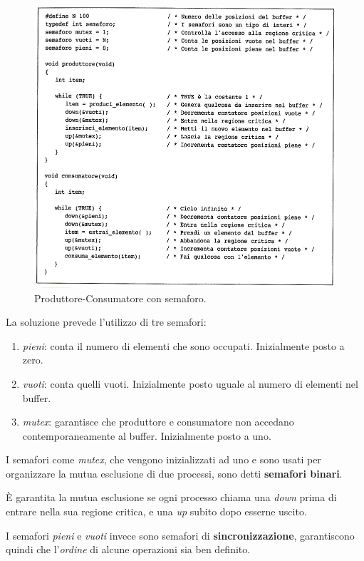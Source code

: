 \begin{figure}[H]
    \centering
    \includegraphics[width=1\linewidth]{assets/producerconsumersemaphore6.png}
    \caption{Produttore-Consumatore con semaforo.}
    \label{producerconsumersemaphore}
\end{figure}

La soluzione prevede l'utilizzo di tre semafori:
\begin{enumerate}
    \item \textit{pieni}: conta il numero di elementi che sono occupati. Inizialmente posto a zero.
    \item \textit{vuoti}: conta quelli vuoti. Inizialmente posto uguale al numero di elementi nel buffer.
    \item \textit{mutex}: garantisce che produttore e consumatore non accedano contemporaneamente al buffer. Inizialmente posto a uno.
\end{enumerate}

I semafori come \textit{mutex}, che vengono inizializzati ad uno e sono usati per organizzare la mutua esclusione di due processi, sono detti \textbf{semafori binari}.

È garantita la mutua esclusione se ogni processo chiama una \textit{down} prima di entrare nella sua regione critica, e una \textit{up} subito dopo esserne uscito.

I semafori \textit{pieni} e \textit{vuoti} invece sono semafori di \textbf{sincronizzazione}, garantiscono quindi che l'\textit{ordine} di alcune operazioni sia ben definito.




